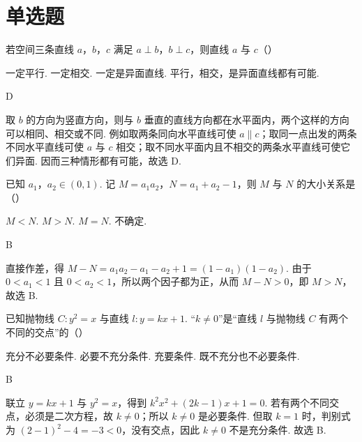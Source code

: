 \section{单选题}

\begin{problem}
若空间三条直线 \(a\)，\(b\)，\(c\) 满足 \(a\perp b\)，\(b\perp c\)，则直线 \(a\) 与 \(c\)（\quad）

\choices
    {一定平行.}
    {一定相交.}
    {一定是异面直线.}
    {平行，相交，是异面直线都有可能.}
\end{problem}

\begin{answer}
D
\end{answer}

\begin{solution}
取 \(b\) 的方向为竖直方向，则与 \(b\) 垂直的直线方向都在水平面内，两个这样的方向可以相同、相交或不同. 例如取两条同向水平直线可使 \(a\parallel c\)；取同一点出发的两条不同水平直线可使 \(a\) 与 \(c\) 相交；取不同水平面内且不相交的两条水平直线可使它们异面. 因而三种情形都有可能，故选 D.
\end{solution}

\begin{problem}
已知 \(a_1\)，\(a_2\in(0,1)\). 记 \(M=a_1a_2\)，\(N=a_1+a_2-1\)，则 \(M\) 与 \(N\) 的大小关系是（\quad）

\choices
    {\(M<N\).}
    {\(M>N\).}
    {\(M=N\).}
    {不确定.}
\end{problem}

\begin{answer}
B
\end{answer}

\begin{solution}
直接作差，得 \(M-N=a_1a_2-a_1-a_2+1=(1-a_1)(1-a_2)\). 由于 \(0<a_1<1\) 且 \(0<a_2<1\)，所以两个因子都为正，从而 \(M-N>0\)，即 \(M>N\)，故选 B.
\end{solution}

\begin{problem}
已知抛物线 \(C:y^2=x\) 与直线 \(l:y=kx+1\). “\(k\ne0\)”是“直线 \(l\) 与抛物线 \(C\) 有两个不同的交点”的（\quad）

\choices
    {充分不必要条件.}
    {必要不充分条件.}
    {充要条件.}
    {既不充分也不必要条件.}
\end{problem}

\begin{answer}
B
\end{answer}

\begin{solution}
联立 \(y=kx+1\) 与 \(y^2=x\)，得到 \(k^2x^2+(2k-1)x+1=0\). 若有两个不同交点，必须是二次方程，故 \(k\ne0\)；所以 \(k\ne0\) 是必要条件. 但取 \(k=1\) 时，判别式为 \((2-1)^2-4=-3<0\)，没有交点，因此 \(k\ne0\) 不是充分条件. 故选 B.
\end{solution}


